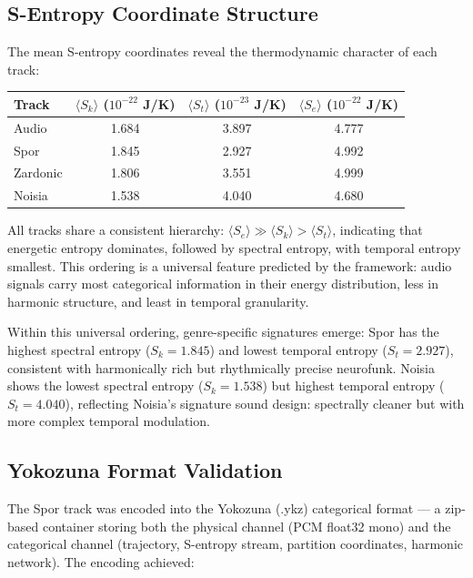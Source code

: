 \documentclass[twocolumn,10pt]{article}
\theoremstyle{remark}
\begin{document}
\subsection{S-Entropy Coordinate Structure}

The mean S-entropy coordinates reveal the thermodynamic character of each track:

\begin{center}
\begin{tabular}{lccc}
\toprule
Track & $\langle S_k \rangle$ ($10^{-22}$ J/K) & $\langle S_t \rangle$ ($10^{-23}$ J/K) & $\langle S_e \rangle$ ($10^{-22}$ J/K) \\
\midrule
Audio  & 1.684 & 3.897 & 4.777 \\
Spor         & 1.845 & 2.927 & 4.992 \\
Zardonic & 1.806 & 3.551 & 4.999 \\
Noisia       & 1.538 & 4.040 & 4.680 \\
\bottomrule
\end{tabular}
\end{center}

All tracks share a consistent hierarchy: $\langle S_e \rangle \gg \langle S_k \rangle > \langle S_t \rangle$, indicating that energetic entropy dominates, followed by spectral entropy, with temporal entropy smallest. This ordering is a universal feature predicted by the framework: audio signals carry most categorical information in their energy distribution, less in harmonic structure, and least in temporal granularity.

Within this universal ordering, genre-specific signatures emerge: Spor has the highest spectral entropy ($S_k = 1.845$) and lowest temporal entropy ($S_t = 2.927$), consistent with harmonically rich but rhythmically precise neurofunk. Noisia shows the lowest spectral entropy ($S_k = 1.538$) but highest temporal entropy ($S_t = 4.040$), reflecting Noisia's signature sound design: spectrally cleaner but with more complex temporal modulation.

\subsection{Yokozuna Format Validation}

The Spor track was encoded into the Yokozuna (.ykz) categorical format --- a zip-based container storing both the physical channel (PCM float32 mono) and the categorical channel (trajectory, S-entropy stream, partition coordinates, harmonic network). The encoding achieved:
\end{document}
